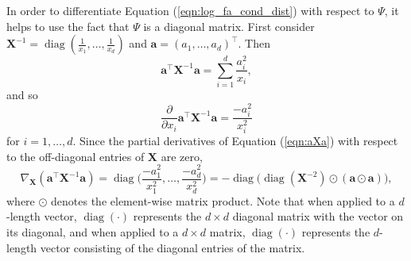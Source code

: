 \documentclass[msc,deptreport.inf]{infthesis} %
\newcommand{\matr}[1]{\mathbf{#1}}
\newcommand{\diag}{\mathop{\mathrm{diag}}}
\begin{document}
In order to differentiate Equation (\ref{eqn:log_fa_cond_dist}) with respect to $\Psi$, it helps to use the fact that $\Psi$ is a diagonal matrix. First consider $\matr{X}^{-1} = \diag(\frac{1}{x_1}, \dots, \frac{1}{x_d})$ and $\matr{a} = (a_1, \dots, a_d)^\intercal$. Then 
\begin{equation}\label{eqn:aXa}
	\matr{a}^\intercal \matr{X}^{-1} \matr{a} = \sum_{i=1}^d \frac{a_i^2}{x_i},
\end{equation}
and so
\begin{equation}
	\frac{\partial}{\partial x_i} \matr{a}^\intercal \matr{X}^{-1} \matr{a} = \frac{-a_i^2}{x_i^2}
\end{equation}
for $i=1, \dots, d$. Since the partial derivatives of Equation (\ref{eqn:aXa}) with respect to the off-diagonal entries of $\matr{X}$ are zero, 
\begin{equation}
	\nabla_\matr{X} (\matr{a}^\intercal \matr{X}^{-1} \matr{a}) 
	= \diag\Big({\frac{-a_1^2}{x_1^2}, \dots, \frac{-a_d^2}{x_d^2}}\Big)
	= -\diag\Big(\diag(\matr{X}^{-2}) \odot (\matr{a} \odot \matr{a})\Big),
\end{equation}
where $\odot$ denotes the element-wise matrix product. Note that when applied to a $d$-length vector, $\diag(\cdot)$ represents the $d \times d$ diagonal matrix with the vector on its diagonal, and when applied to a $d \times d$ matrix, $\diag(\cdot)$ represents the $d$-length vector consisting of the diagonal entries of the matrix. 
\end{document}
